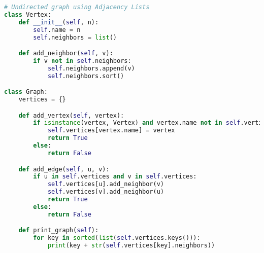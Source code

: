 \documentclass{article}
\begin{document}
\begin{lstlisting}[language=Python]
# Undirected graph using Adjacency Lists
class Vertex:
    def __init__(self, n):
        self.name = n
        self.neighbors = list()

    def add_neighbor(self, v):
        if v not in self.neighbors:
            self.neighbors.append(v)
            self.neighbors.sort()

class Graph:
    vertices = {}

    def add_vertex(self, vertex):
        if isinstance(vertex, Vertex) and vertex.name not in self.vertices:
            self.vertices[vertex.name] = vertex
            return True
        else:
            return False

    def add_edge(self, u, v):
        if u in self.vertices and v in self.vertices:
            self.vertices[u].add_neighbor(v)
            self.vertices[v].add_neighbor(u)
            return True
        else:
            return False

    def print_graph(self):
        for key in sorted(list(self.vertices.keys())):
            print(key + str(self.vertices[key].neighbors))
\end{lstlisting}
\end{document}
